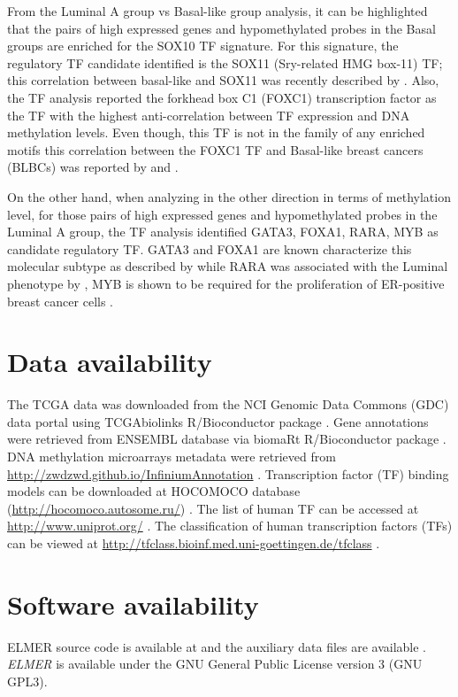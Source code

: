 From the  Luminal A group vs Basal-like group analysis, it can be highlighted that the pairs of
high expressed genes and hypomethylated probes in the Basal groups are enriched for the SOX10 TF signature.
For this signature, the regulatory TF candidate identified is the SOX11 (Sry-related HMG box-11) TF; this
correlation between basal-like and SOX11 was recently described by .
Also, the TF analysis  reported the forkhead box C1 (FOXC1) transcription factor as the TF with the
highest anti-correlation between TF expression and DNA methylation levels. Even though,
this TF is not in the family of any enriched motifs this correlation between the FOXC1 TF and Basal-like
breast cancers (BLBCs) was reported by  and .

On the other hand, when analyzing in the other direction in terms of methylation level, for  those pairs of high expressed genes and hypomethylated probes in the Luminal A group, the TF analysis identified GATA3, FOXA1, RARA, MYB as candidate regulatory TF. GATA3 and FOXA1 are known characterize this  molecular subtype  as described by  while RARA was associated with the Luminal phenotype by , MYB
is shown to be required for the proliferation of ER-positive breast cancer cells \cite{mitra2016cdk9}.

\section*{Data availability} %
The TCGA data was downloaded from the NCI Genomic Data Commons (GDC) data portal \cite{grossman2016toward}
using TCGAbiolinks R/Bioconductor package \cite{colaprico2015tcgabiolinks,10.12688/f1000research.8923.2}.
Gene annotations were retrieved from ENSEMBL \cite{yates2015ensembl} database via biomaRt R/Bioconductor
package \cite{durinck2005biomart,durinck2009mapping}.
DNA methylation microarrays metadata were retrieved from \url{http://zwdzwd.github.io/InfiniumAnnotation} \cite{doi:10.1093/nar/gkw967}.
Transcription factor (TF) binding models can be downloaded at HOCOMOCO database (\url{http://hocomoco.autosome.ru/}) \cite{kulakovskiy2016hocomoco}.
The list of human TF can be accessed at \url{http://www.uniprot.org/}  \cite{apweiler2004uniprot}.
The classification of human transcription factors (TFs) can be viewed at \url{http://tfclass.bioinf.med.uni-goettingen.de/tfclass}  \cite{wingender2013tfclass}.

\section*{Software availability}

ELMER	source code  is available at 
and the auxiliary data files are available .
\textit{ELMER} is available under the GNU General Public License version 3 (GNU GPL3).
